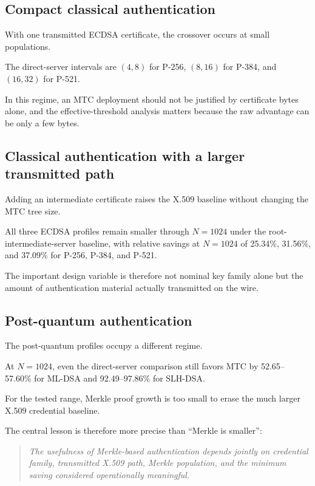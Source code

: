 \documentclass[journal]{IEEEtran}
\begin{document}
\subsection{Compact classical authentication}



With one transmitted ECDSA certificate, the crossover occurs at small populations.

The direct-server intervals are $(4,8)$ for P-256, $(8,16)$ for P-384, and $(16,32)$ for P-521.

In this regime, an MTC deployment should not be justified by certificate bytes alone, and the effective-threshold analysis matters because the raw advantage can be only a few bytes.



\subsection{Classical authentication with a larger transmitted path}



Adding an intermediate certificate raises the X.509 baseline without changing the MTC tree size.

All three ECDSA profiles remain smaller through $N=1024$ under the root-intermediate-server baseline, with relative savings at $N=1024$ of 25.34\%, 31.56\%, and 37.09\% for P-256, P-384, and P-521.

The important design variable is therefore not nominal key family alone but the amount of authentication material actually transmitted on the wire.



\subsection{Post-quantum authentication}



The post-quantum profiles occupy a different regime.

At $N=1024$, even the direct-server comparison still favors MTC by 52.65--57.60\% for ML-DSA and 92.49--97.86\% for SLH-DSA.

For the tested range, Merkle proof growth is too small to erase the much larger X.509 credential baseline.



The central lesson is therefore more precise than ``Merkle is smaller'':

\begin{quote}

\emph{The usefulness of Merkle-based authentication depends jointly on credential family, transmitted X.509 path, Merkle population, and the minimum saving considered operationally meaningful.}

\end{quote}
\end{document}
